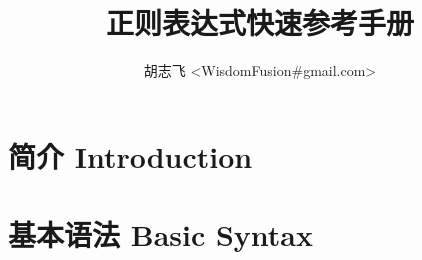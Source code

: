 \documentclass[12pt,a4paper,twoside]{ctexart}
\begin{document}
\title{正则表达式快速参考手册}
\author{胡志飞 <WisdomFusion\#gmail.com>}
\maketitle{}
\thispagestyle{empty}
\clearpage{}

\tableofcontents{}
\thispagestyle{empty}
\clearpage{}

\setcounter{page}{1}

\section[简介]{简介 Introduction}
\label{sec:intro}

\lipsum[1]

\lipsum[2]

\section[基本语法]{基本语法 Basic Syntax}
\label{sec:basic-syntax}
\end{document}
